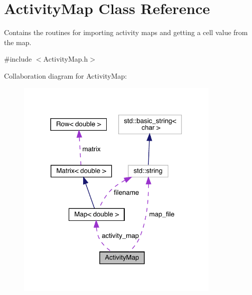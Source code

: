 \hypertarget{class_activity_map}{}\section{Activity\+Map Class Reference}
\label{class_activity_map}


Contains the routines for importing activity maps and getting a cell value from the map.  




{\ttfamily \#include $<$Activity\+Map.\+h$>$}



Collaboration diagram for Activity\+Map\+:
\nopagebreak
\begin{figure}[H]
\begin{center}
\leavevmode
\includegraphics[width=276pt]{class_activity_map__coll__graph}
\end{center}
\end{figure}
